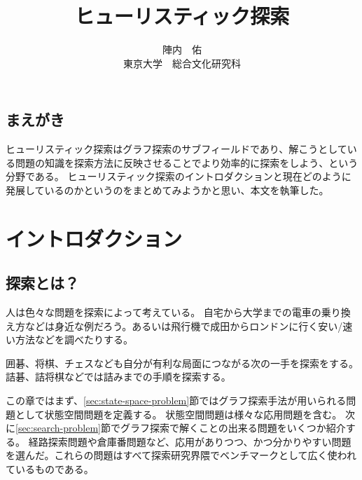 \documentclass{book}
\title{ヒューリスティック探索}
\author{陣内　佑 \\
東京大学　総合文化研究科}
\begin{document}
\maketitle

\tableofcontents
\newpage

\section*{まえがき}
ヒューリスティック探索はグラフ探索のサブフィールドであり、解こうとしている問題の知識を探索方法に反映させることでより効率的に探索をしよう、という分野である。
ヒューリスティック探索のイントロダクションと現在どのように発展しているのかというのをまとめてみようかと思い、本文を執筆した。



\chapter{イントロダクション}
\label{ch:introduction}
\section{探索とは？}
\label{sec:search}

人は色々な問題を探索によって考えている。
自宅から大学までの電車の乗り換え方などは身近な例だろう。あるいは飛行機で成田からロンドンに行く安い/速い方法などを調べたりする。

囲碁、将棋、チェスなども自分が有利な局面につながる次の一手を探索をする。
詰碁、詰将棋などでは詰みまでの手順を探索する。

この章ではまず、\ref{sec:state-space-problem}節ではグラフ探索手法が用いられる問題として状態空間問題を定義する。
状態空間問題は様々な応用問題を含む。
次に\ref{sec:search-problem}節でグラフ探索で解くことの出来る問題をいくつか紹介する。
経路探索問題や倉庫番問題など、応用がありつつ、かつ分かりやすい問題を選んだ。これらの問題はすべて探索研究界隈でベンチマークとして広く使われているものである。
\end{document}
